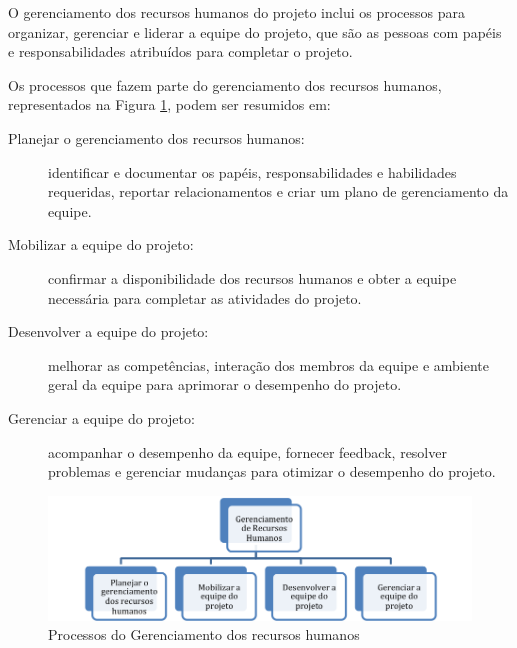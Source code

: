 


O gerenciamento dos recursos humanos do projeto inclui os processos para organizar, gerenciar e liderar a equipe do projeto, que são as pessoas com papéis e responsabilidades atribuídos para completar o projeto.

Os processos que fazem parte do gerenciamento dos recursos humanos, representados na Figura \ref{fig:proc:ger:rh}, podem ser resumidos em:

\begin{description}

	\item[Planejar o gerenciamento dos recursos humanos:] identificar e documentar os papéis, responsabilidades e habilidades requeridas, reportar relacionamentos e criar um plano de gerenciamento da equipe.
	
	\item[Mobilizar a equipe do projeto:] confirmar a disponibilidade dos recursos humanos e obter a equipe necessária para completar as atividades do projeto.
	
	\item[Desenvolver a equipe do projeto:] melhorar as competências, interação dos membros da equipe e ambiente geral da equipe para aprimorar o desempenho do projeto.
	
	\item[Gerenciar a equipe do projeto:] acompanhar o desempenho da equipe, fornecer feedback, resolver problemas e gerenciar mudanças para otimizar o desempenho do projeto.

\end{description}

\begin{figure}[!h]
	\centering
	\includegraphics[scale=0.75]{Figuras/gerenciamento_rh.png}
	\caption{Processos do Gerenciamento dos recursos humanos}
	\label{fig:proc:ger:rh}
\end{figure}

